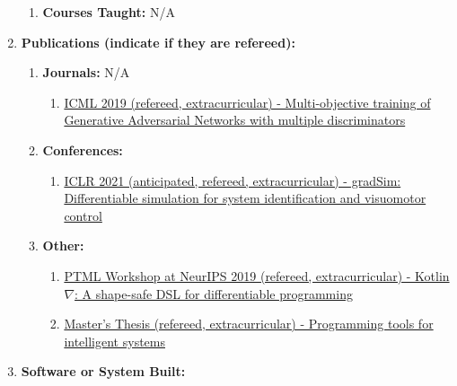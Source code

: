 \documentclass[11pt]{article}
\begin{document}
\begin{enumerate}
\begin{enumerate}
            \item \textbf{Courses Taught:} N/A

        \end{enumerate}

        \item \textbf{Publications (indicate if they are refereed):}
        \begin{enumerate}
            \item \textbf{Journals:} N/A
            \begin{enumerate}
            \item \href{http://proceedings.mlr.press/v97/albuquerque19a/albuquerque19a.pdf}{ICML 2019 (refereed, extracurricular) - Multi-objective training of Generative Adversarial Networks with multiple discriminators}
            \end{enumerate}
            \item \textbf{Conferences:}
            \begin{enumerate}
            \item \href{https://openreview.net/forum?id=c_E8kFWfhp0}{ICLR 2021 (anticipated, refereed, extracurricular) - gradSim: Differentiable simulation for system identification and visuomotor control}
            \end{enumerate}

            \item \textbf{Other:}
            \begin{enumerate}
                \item \href{https://openreview.net/forum?id=SkluMSZ08H}{PTML Workshop at NeurIPS 2019 (refereed, extracurricular) - Kotlin$\nabla$: A shape-safe DSL for differentiable programming}
                \item \href{http://breandan.net/public/masters_thesis.pdf}{Master's Thesis (refereed, extracurricular) - Programming tools for intelligent systems}
            \end{enumerate}

        \end{enumerate}

        \item \textbf{Software or System Built:}


\end{enumerate}
\end{document}
